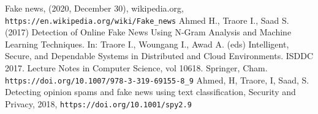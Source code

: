 \documentclass[a4paper,12pt,nottoc]{article}
\begin{document}
%
\begin{thebibliography}{9}
 Fake news, (2020, December 30), wikipedia.org, \\\texttt{https://en.wikipedia.org/wiki/Fake\_news}
 Ahmed H., Traore I., Saad S. (2017) Detection of Online Fake News Using N-Gram Analysis and Machine Learning Techniques. In: Traore I., Woungang I., Awad A. (eds) Intelligent, Secure, and Dependable Systems in Distributed and Cloud Environments. ISDDC 2017. Lecture Notes in Computer Science, vol 10618. Springer, Cham. \texttt{https://doi.org/10.1007/978-3-319-69155-8\_9}
 Ahmed, H, Traore, I, Saad, S. Detecting opinion spams and fake news using text classification, Security and Privacy, 2018, \texttt{https://doi.org/10.1001/spy2.9}
\end{thebibliography}
\end{document}
